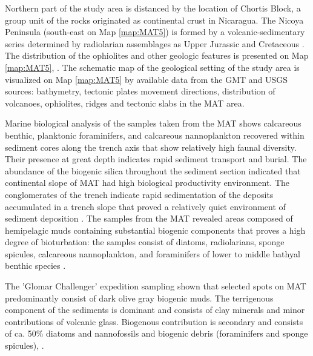 \documentclass[11pt,a4paper]{report}
\begin{document}
Northern part of the study area is distanced by the location of Chortis Block, a group unit of the rocks originated as continental crust in Nicaragua. The Nicoya Peninsula  (south-east on Map \ref{map:MAT5}) is formed by a volcanic-sedimentary series determined by radiolarian assemblages as Upper Jurassic and Cretaceous \cite{SchmidtEffing1979}. The distribution of the ophiolites and other geologic features is presented on Map \ref{map:MAT5}, \cite{Galli1979}. The schematic map of the geological setting of the study area is visualized on Map \ref{map:MAT5} by available data from the \ac{GMT} and \ac{USGS} sources: bathymetry, tectonic plates movement directions, distribution of volcanoes, ophiolites, ridges and tectonic slabs in the \ac{MAT} area.

Marine biological analysis of the samples taken from the \ac{MAT} \cite{Shipboard19824} shows calcareous benthic, planktonic foraminifers, and calcareous nannoplankton recovered within sediment cores along the trench axis that show relatively high faunal diversity. Their presence at great depth indicates rapid sediment transport and burial. The abundance of the biogenic silica throughout the sediment section indicated that continental slope of \ac{MAT} had high biological productivity environment. The conglomerates of the trench indicate rapid sedimentation of the deposits accumulated in a trench slope that proved a relatively quiet environment of sediment deposition \cite{Coulbourn1982}. The samples from the \ac{MAT} revealed areas composed of hemipelagic muds containing substantial biogenic components that proves a high degree of bioturbation: the samples consist of diatoms, radiolarians, sponge spicules, calcareous nannoplankton, and foraminifers of lower to middle bathyal benthic species \cite{Shipboard495}. 

The 'Glomar Challenger' expedition sampling shown that selected spots on \ac{MAT} predominantly consist of dark olive gray biogenic muds. The terrigenous component of the sediments is dominant and consists of clay minerals and minor contributions of volcanic glass. Biogenous contribution is secondary and consists of ca. 50\% diatoms and nannofossils and biogenic debris (foraminifers and sponge spicules), \cite{Lemenkova2019108}.
\end{document}
